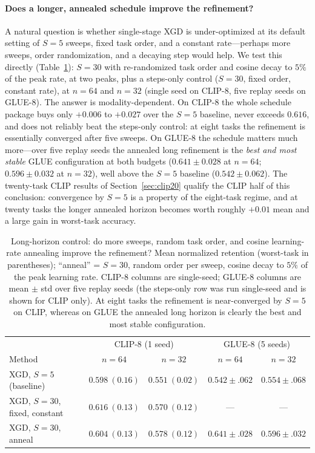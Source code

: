 \documentclass{article} %
\begin{document}
\paragraph{Does a longer, annealed schedule improve the refinement?}
A natural question is whether single-stage XGD is under-optimized at its default setting of $S=5$ sweeps, fixed task order, and a constant rate---perhaps more sweeps, order randomization, and a decaying step would help. We test this directly (Table~\ref{tab:longapr}): $S=30$ with re-randomized task order and cosine decay to $5\%$ of the peak rate, at two peaks, plus a steps-only control ($S=30$, fixed order, constant rate), at $n=64$ and $n=32$ (single seed on CLIP-8, five replay seeds on GLUE-8). The answer is modality-dependent. On CLIP-8 the whole schedule package buys only $+0.006$ to $+0.027$ over the $S=5$ baseline, never exceeds $0.616$, and does not reliably beat the steps-only control: at eight tasks the refinement is essentially converged after five sweeps. On GLUE-8 the schedule matters much more---over five replay seeds the annealed long refinement is the \emph{best and most stable} GLUE configuration at both budgets ($0.641\pm0.028$ at $n=64$; $0.596\pm0.032$ at $n=32$), well above the $S=5$ baseline ($0.542\pm0.062$). The twenty-task CLIP results of Section~\ref{sec:clip20} qualify the CLIP half of this conclusion: convergence by $S=5$ is a property of the eight-task regime, and at twenty tasks the longer annealed horizon becomes worth roughly $+0.01$ mean and a large gain in worst-task accuracy.

\begin{table}[t]
\centering
\small
\caption{Long-horizon control: do more sweeps, random task order, and cosine learning-rate annealing improve the refinement? Mean normalized retention (worst-task in parentheses); ``anneal'' = $S{=}30$, random order per sweep, cosine decay to $5\%$ of the peak learning rate. CLIP-8 columns are single-seed; GLUE-8 columns are mean $\pm$ std over five replay seeds (the steps-only row was run single-seed and is shown for CLIP only). At eight tasks the refinement is near-converged by $S{=}5$ on CLIP, whereas on GLUE the annealed long horizon is clearly the best and most stable configuration.}
\label{tab:longapr}
\begin{tabular}{lcccc}
\toprule
 & \multicolumn{2}{c}{CLIP-8 (1 seed)} & \multicolumn{2}{c}{GLUE-8 (5 seeds)} \\
Method & $n{=}64$ & $n{=}32$ & $n{=}64$ & $n{=}32$ \\
\midrule
XGD, $S{=}5$ (baseline)        & $0.598\ (0.16)$ & $0.551\ (0.02)$ & $0.542\pm.062$ & $0.554\pm.068$ \\
XGD, $S{=}30$, fixed, constant & $\mathbf{0.616}\ (0.13)$ & $0.570\ (0.12)$ & --- & --- \\
XGD, $S{=}30$, anneal          & $0.604\ (0.13)$ & $\mathbf{0.578}\ (0.12)$ & $\mathbf{0.641\pm.028}$ & $\mathbf{0.596\pm.032}$ \\
\bottomrule
\end{tabular}
\end{table}
\end{document}
